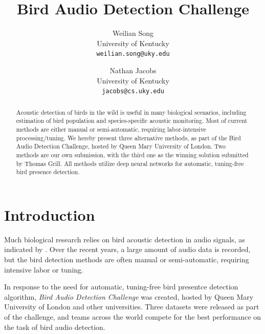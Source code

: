 \documentclass[10pt,twocolumn,letterpaper]{article}
\begin{document}
\title{Bird Audio Detection Challenge}

\author{Weilian Song\\ 
University of Kentucky\\ 
{\tt\small weilian.song@uky.edu}
\and Nathan Jacobs\\ 
University of Kentucky\\ 
{\tt\small jacobs@cs.uky.edu}
}


\maketitle

\begin{abstract}  

	Acoustic detection of birds in the wild is useful in many biological
	scenarios, including estimation of bird population and species-specific
	acoustic monitoring. Most of current methods are either manual or
	semi-automatic, requiring labor-intensive processing/tuning. We hereby
	present three alternative methods, as part of the Bird Audio Detection
	Challenge, hosted by Queen Mary University of London. Two methods are our
	own submission, with the third one as the winning solution submitted by
	Thomas Grill. All methods utilize deep neural networks for automatic,
	tuning-free bird presence detection.

\end{abstract}

\section{Introduction}

Much biological research relies on bird acoustic detection in audio signals,
as indicated by \cite{bad}. Over the recent years, a large amount of audio
data is recorded, but the bird detection methods are often manual or
semi-automatic, requiring intensive labor or tuning.

In response to the need for automatic, tuning-free bird presentce detection
algorithm, \textit{Bird Audio Detection Challenge} was created, hosted by
Queen Mary University of London and other universities. Three datasets were
released as part of the challenge, and teams across the world compete for
the best performance on the task of bird audio detection.
\end{document}
